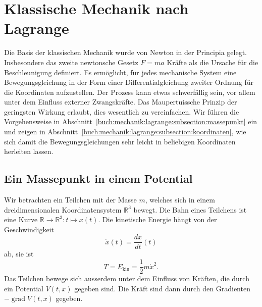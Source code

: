 %
%
%
\section{Klassische Mechanik nach Lagrange
\label{buch:mechanik:section:lagrange}}
Die Basis der klassischen Mechanik wurde von Newton in der
Principia gelegt.
%
Insbesondere das zweite newtonsche Gesetz
\(
F=ma
\)
Kräfte als die Ursache für die Beschleunigung definiert.
Es ermöglicht, für jedes mechanische System eine Bewegungsgleichung
in der Form einer Differentialgleichung zweiter Ordnung für die
Koordinaten aufzustellen.
Der Prozess kann etwas schwerfällig sein, vor allem unter dem Einfluss
externer Zwangskräfte.
Das Maupertuissche Prinzip der geringsten Wirkung erlaubt, dies wesentlich
zu vereinfachen.
%
Wir führen die Vorgehensweise in
Abschnitt~\ref{buch:mechanik:lagrange:subsection:massepunkt}
ein und zeigen in
Abschnitt~\ref{buch:mechanik:lagrange:subsection:koordinaten},
wie sich damit die Bewegungsgleichungen sehr leicht in beliebigen
Koordinaten herleiten lassen.


%
%
\subsection{Ein Massepunkt in einem Potential
\label{buch:mechanik:lagrange:subsection:massepunkt}}
Wir betrachten ein Teilchen mit der Masse $m$, welches sich in
einem dreidimensionalen Koordinatensystem $\mathbb{R}^3$ bewegt.
Die Bahn eines Teilchens ist eine Kurve
$\mathbb{R}\to\mathbb{R}^3:t\mapsto x(t)$.
Die kinetische Energie hängt von der Geschwindigkeit 
%
%
\[
\dot{x}(t) = \frac{dx}{dt}(t)
\]
ab, sie ist
\[
T=
E_{\text{kin}}
=
\frac12 m\dot{x}^2.
\]
Das Teilchen bewege sich ausserdem unter dem Einfluss von Kräften,
die durch ein Potential $V(t,x)$ gegeben sind.
Die Kräft sind dann durch den Gradienten $-\operatorname{grad}V(t,x)$ 
gegeben.

